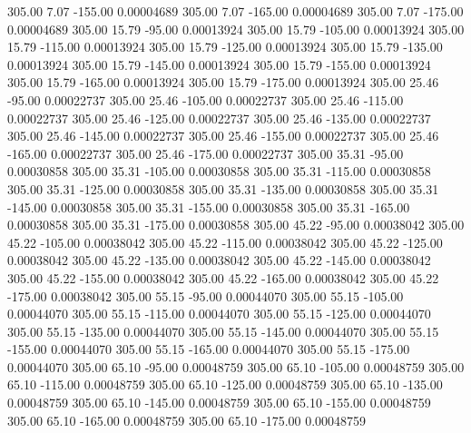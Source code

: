     305.00      7.07   -155.00     0.00004689
    305.00      7.07   -165.00     0.00004689
    305.00      7.07   -175.00     0.00004689
    305.00     15.79    -95.00     0.00013924
    305.00     15.79   -105.00     0.00013924
    305.00     15.79   -115.00     0.00013924
    305.00     15.79   -125.00     0.00013924
    305.00     15.79   -135.00     0.00013924
    305.00     15.79   -145.00     0.00013924
    305.00     15.79   -155.00     0.00013924
    305.00     15.79   -165.00     0.00013924
    305.00     15.79   -175.00     0.00013924
    305.00     25.46    -95.00     0.00022737
    305.00     25.46   -105.00     0.00022737
    305.00     25.46   -115.00     0.00022737
    305.00     25.46   -125.00     0.00022737
    305.00     25.46   -135.00     0.00022737
    305.00     25.46   -145.00     0.00022737
    305.00     25.46   -155.00     0.00022737
    305.00     25.46   -165.00     0.00022737
    305.00     25.46   -175.00     0.00022737
    305.00     35.31    -95.00     0.00030858
    305.00     35.31   -105.00     0.00030858
    305.00     35.31   -115.00     0.00030858
    305.00     35.31   -125.00     0.00030858
    305.00     35.31   -135.00     0.00030858
    305.00     35.31   -145.00     0.00030858
    305.00     35.31   -155.00     0.00030858
    305.00     35.31   -165.00     0.00030858
    305.00     35.31   -175.00     0.00030858
    305.00     45.22    -95.00     0.00038042
    305.00     45.22   -105.00     0.00038042
    305.00     45.22   -115.00     0.00038042
    305.00     45.22   -125.00     0.00038042
    305.00     45.22   -135.00     0.00038042
    305.00     45.22   -145.00     0.00038042
    305.00     45.22   -155.00     0.00038042
    305.00     45.22   -165.00     0.00038042
    305.00     45.22   -175.00     0.00038042
    305.00     55.15    -95.00     0.00044070
    305.00     55.15   -105.00     0.00044070
    305.00     55.15   -115.00     0.00044070
    305.00     55.15   -125.00     0.00044070
    305.00     55.15   -135.00     0.00044070
    305.00     55.15   -145.00     0.00044070
    305.00     55.15   -155.00     0.00044070
    305.00     55.15   -165.00     0.00044070
    305.00     55.15   -175.00     0.00044070
    305.00     65.10    -95.00     0.00048759
    305.00     65.10   -105.00     0.00048759
    305.00     65.10   -115.00     0.00048759
    305.00     65.10   -125.00     0.00048759
    305.00     65.10   -135.00     0.00048759
    305.00     65.10   -145.00     0.00048759
    305.00     65.10   -155.00     0.00048759
    305.00     65.10   -165.00     0.00048759
    305.00     65.10   -175.00     0.00048759
